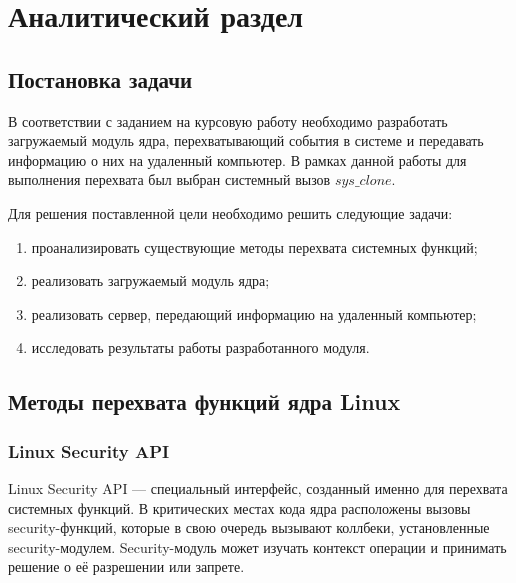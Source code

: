 \chapter{Аналитический раздел}
\label{cha:analysis}
%
%
\section{Постановка задачи}

В соответствии с заданием на курсовую работу необходимо разработать загружаемый модуль ядра, перехватывающий события в системе и передавать информацию о них на удаленный компьютер. В рамках данной работы для выполнения перехвата был выбран системный вызов $sys\_clone$.

Для решения поставленной цели необходимо решить следующие задачи:
\begin{enumerate}
	\item проанализировать существующие методы перехвата системных функций;
	\item реализовать загружаемый модуль ядра;
	\item реализовать сервер, передающий информацию на удаленный компьютер;
	\item исследовать результаты работы разработанного модуля.
\end{enumerate}


\section{Методы перехвата функций ядра Linux}


\subsection{Linux Security API}
Linux Security API — специальный интерфейс, созданный именно для перехвата системных функций. В критических местах кода ядра расположены вызовы security-функций, которые в свою очередь вызывают коллбеки, установленные security-модулем. Security-модуль может изучать контекст операции и принимать решение о её разрешении или запрете.

